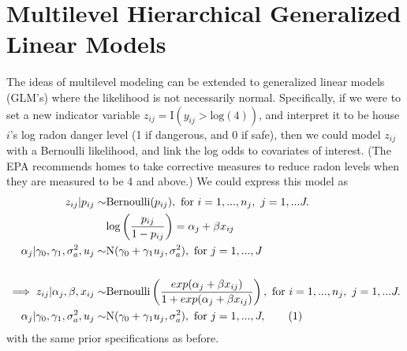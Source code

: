 \documentclass{article}
\newcommand\numberthis{\addtocounter{equation}{1}\tag{\theequation}}
\begin{document}
\section{Multilevel Hierarchical Generalized Linear Models}
The ideas of multilevel modeling can be extended to generalized linear models
(GLM's) where the likelihood is not necessarily normal. Specifically, if we
were to set a new indicator variable $z_{ij} = \text{I}(y_{ij}>\text{log}(4))$,
and interpret it to be house $i$'s log radon danger level (1 if dangerous, and
0 if safe), then we could model $z_{ij}$ with a Bernoulli likelihood, and link
the log odds to covariates of interest. (The EPA recommends homes to take
corrective measures to reduce radon levels when they are measured to be 4 and
above.) We could express this model as
\begin{align*}
  z_{ij}|p_{ij} \sim & \text{Bernoulli}(p_{ij}),\text{ for }i=1,...,n_j,~j=1,...J.\\
  &\text{log}\left(\frac{p_{ij}}{1-p_{ij}}\right) = \alpha_j+\beta x_{ij}\\
  \alpha_{j}|\gamma_0,\gamma_1,\sigma_a^2,u_j \sim & \text{N}(\gamma_0 +
      \gamma_1 u_j,\sigma_a^2),\text{ for }j=1,...,J\\
  \\
  \implies
  z_{ij}|\alpha_j,\beta,x_{ij} \sim &
      \text{Bernoulli}\left(\frac{exp(\alpha_j+\beta x_{ij})}{1+exp(\alpha_j+\beta
      x_{ij})}\right),\text{ for }i=1,...,n_j,~j=1,...J.\\
  \alpha_{j}|\gamma_0,\gamma_1,\sigma_a^2,u_j \sim & \text{N}(\gamma_0 +
      \gamma_1 u_j,\sigma_a^2),\text{ for }j=1,...,J, \numberthis
\end{align*}
with the same prior specifications as before.
\end{document}
